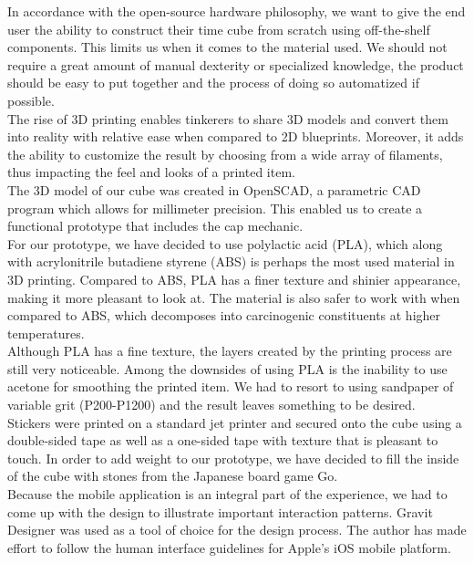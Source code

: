 \documentclass{article}
\begin{document}
In accordance with the open-source hardware philosophy, we want to give the end user the ability to construct their time cube from scratch using off-the-shelf components. This limits us when it comes to the material used. We should not require a great amount of manual dexterity or specialized knowledge, the product should be easy to put together and the process of doing so automatized if possible.\\

The rise of 3D printing enables tinkerers to share 3D models and convert them into reality with relative ease when compared to 2D blueprints. Moreover, it adds the ability to customize the result by choosing from a wide array of filaments, thus impacting the feel and looks of a printed item.\\

The 3D model of our cube was created in OpenSCAD, a parametric CAD program which allows for millimeter precision. This enabled us to create a functional prototype that includes the cap mechanic.\\

For our prototype, we have decided to use polylactic acid (PLA), which along with acrylonitrile butadiene styrene (ABS) is perhaps the most used material in 3D printing. Compared to ABS, PLA has a finer texture and shinier appearance, making it more pleasant to look at. The material is also safer to work with when compared to ABS, which decomposes into carcinogenic constituents at higher temperatures.\\

Although PLA has a fine texture, the layers created by the printing process are still very noticeable. Among the downsides of using PLA is the inability to use acetone for smoothing the printed item. We had to resort to using sandpaper of variable grit (P200-P1200) and the result leaves something to be desired.\\

Stickers were printed on a standard jet printer and secured onto the cube using a double-sided tape as well as a one-sided tape with texture that is pleasant to touch. In order to add weight to our prototype, we have decided to fill the inside of the cube with stones from the Japanese board game Go.\\

Because the mobile application is an integral part of the experience, we had to come up with the design to illustrate important interaction patterns. Gravit Designer was used as a tool of choice for the design process. The author has made effort to follow the human interface guidelines for Apple's iOS mobile platform.
\end{document}
